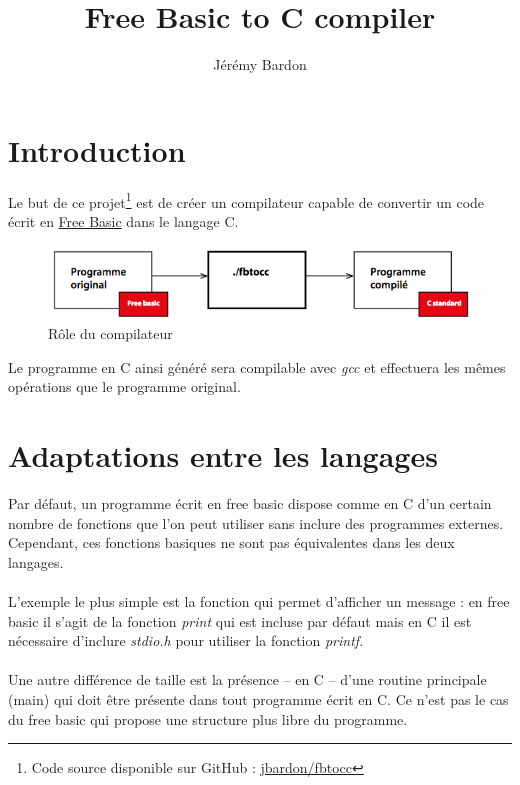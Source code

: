 \documentclass{article}
\title{Free Basic to C compiler}
\author{Jérémy Bardon}
\begin{document}
\maketitle

\renewcommand{\contentsname}{Sommaire}
\tableofcontents	
	
\newpage
	
\section{Introduction}
Le but de ce projet\footnote{Code source disponible sur GitHub : \href{https://github.com/jbardon/fbtocc}{jbardon/fbtocc}} est de créer un compilateur capable de convertir un code écrit 
en \href{http://www.freebasic.net}{Free Basic} dans le langage C. 

\begin{figure}[h]
    \centering
    \includegraphics[scale=0.6]{resources/schema.png}
    \caption{Rôle du compilateur}
\end{figure}
	
Le programme en C
ainsi généré sera compilable avec \emph{gcc} et effectuera les mêmes opérations que 
le programme original.
	
\section{Adaptations entre les langages}
Par défaut, un programme écrit en free basic dispose comme en C d'un 
certain nombre de fonctions que l'on peut utiliser sans inclure des programmes 
externes. Cependant, ces fonctions \og{}basiques\fg{} ne sont pas équivalentes dans 
les deux langages.
\\\\
L'exemple le plus simple est la fonction qui permet d'afficher un message : en 
free basic il s'agit de la fonction \emph{print} qui est incluse 
par défaut mais en C il est nécessaire d'inclure \emph{stdio.h} pour utiliser 
la fonction \emph{printf}.
\\\\
Une autre différence de taille est la présence -- en C -- d'une routine principale 
(main) qui doit être présente dans tout programme écrit en C. Ce n'est pas le cas du 
free basic qui propose une structure plus libre du programme.
\end{document}
